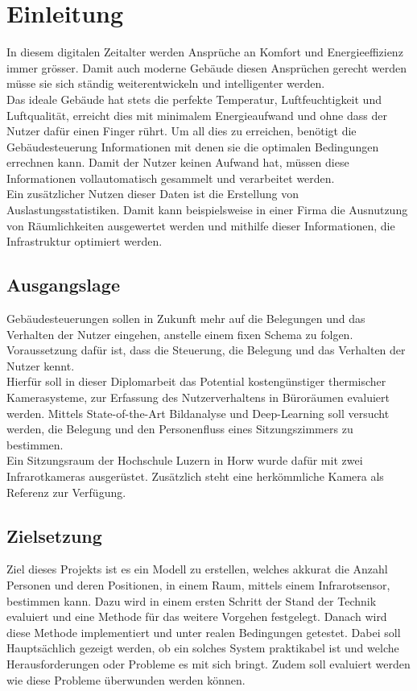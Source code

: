 \chapter{Einleitung}

In diesem digitalen Zeitalter werden Ansprüche an Komfort und Energieeffizienz immer grösser. Damit auch moderne Gebäude diesen Ansprüchen gerecht werden müsse sie sich ständig weiterentwickeln und intelligenter werden.\\
Das ideale Gebäude hat stets die perfekte Temperatur, Luftfeuchtigkeit und Luftqualität, erreicht dies mit minimalem Energieaufwand und ohne dass der Nutzer dafür einen Finger rührt. Um all dies zu erreichen, benötigt die Gebäudesteuerung Informationen mit denen sie die optimalen Bedingungen errechnen kann. Damit der Nutzer keinen Aufwand hat, müssen diese Informationen vollautomatisch gesammelt und verarbeitet werden.\\
Ein zusätzlicher Nutzen dieser Daten ist die Erstellung von Auslastungsstatistiken. Damit kann beispielsweise in einer Firma die Ausnutzung von Räumlichkeiten ausgewertet werden und mithilfe dieser Informationen, die Infrastruktur optimiert werden.

\section{Ausgangslage}
\label{sec:Ausgangslage}

Gebäudesteuerungen sollen in Zukunft mehr auf die Belegungen und das Verhalten der Nutzer eingehen, anstelle einem fixen Schema zu folgen. Voraussetzung dafür ist, dass die Steuerung, die Belegung und das Verhalten der Nutzer kennt.\\
Hierfür soll in dieser Diplomarbeit das Potential kostengünstiger thermischer Kamerasysteme, zur Erfassung des Nutzerverhaltens in Büroräumen evaluiert werden. Mittels State-of-the-Art Bildanalyse und Deep-Learning soll versucht werden, die Belegung und den Personenfluss eines Sitzungszimmers zu bestimmen.\\
Ein Sitzungsraum der Hochschule Luzern in Horw wurde dafür mit zwei Infrarotkameras ausgerüstet. Zusätzlich steht eine herkömmliche Kamera als Referenz zur Verfügung.


\section{Zielsetzung}
\label{sec:Zielsetzung}

Ziel dieses Projekts ist es ein Modell zu erstellen, welches akkurat die Anzahl Personen und deren Positionen, in einem Raum, mittels einem Infrarotsensor, bestimmen kann. Dazu wird in einem ersten Schritt der Stand der Technik evaluiert und eine Methode für das weitere Vorgehen festgelegt. Danach wird diese Methode implementiert und unter realen Bedingungen getestet. Dabei soll Hauptsächlich gezeigt werden, ob ein solches System praktikabel ist und welche Herausforderungen oder Probleme es mit sich bringt. Zudem soll evaluiert werden wie diese Probleme überwunden werden können.

